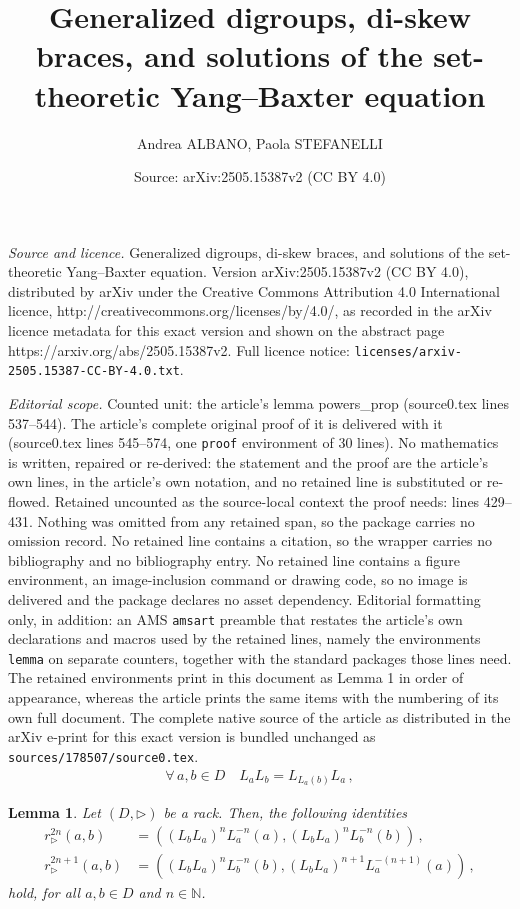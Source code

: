 \documentclass[10pt,a4paper]{amsart}
\title{Generalized digroups, di-skew braces, and solutions of the set-theoretic Yang--Baxter equation}
\author{Andrea ALBANO, Paola STEFANELLI}
\date{Source: arXiv:2505.15387v2 (CC BY 4.0)}
\newtheorem{lemma}{Lemma}
\newcommand{\tr}{\triangleright}
\begin{document}
\maketitle

\noindent\emph{Source and licence.} Generalized digroups, di-skew braces, and solutions of the set-theoretic Yang--Baxter equation. Version arXiv:2505.15387v2 (CC BY 4.0), distributed by arXiv under the Creative Commons Attribution 4.0 International licence, http://creativecommons.org/licenses/by/4.0/, as recorded in the arXiv licence metadata for this exact version and shown on the abstract page https://arxiv.org/abs/2505.15387v2. Full licence notice: \texttt{licenses/arxiv-2505.15387-CC-BY-4.0.txt}.\par\smallskip

\noindent\textit{Editorial scope.} Counted unit: the article's lemma powers\_prop (source0.tex lines 537--544). The article's complete original proof of it is delivered with it (source0.tex lines 545--574, one \texttt{proof} environment of 30 lines). No mathematics is written, repaired or re-derived: the statement and the proof are the article's own lines, in the article's own notation, and no retained line is substituted or re-flowed.  Retained uncounted as the source-local context the proof needs: lines 429--431.  Nothing was omitted from any retained span, so the package carries no omission record.  No retained line contains a citation, so the wrapper carries no bibliography and no bibliography entry.  No retained line contains a figure environment, an image-inclusion command or drawing code, so no image is delivered and the package declares no asset dependency.  Editorial formatting only, in addition: an AMS \texttt{amsart} preamble that restates the article's own declarations and macros used by the retained lines, namely the environments \texttt{lemma} on separate counters, together with the standard packages those lines need.  The retained environments print in this document as Lemma 1 in order of appearance, whereas the article prints the same items with the numbering of its own full document.  The complete native source of the article as distributed in the arXiv e-print for this exact version is bundled unchanged as \texttt{sources/178507/source0.tex}.
\begin{align}\label{self_distri1}
    \forall\, a,b \in D \quad L_aL_b = L_{L_a(b)}L_a \,,
\end{align}

\begin{lemma}\label{powers_prop}
    Let $(D,\triangleright)$ be a rack. Then, the following identities 
    \begin{align}
        r_\tr^{2n}(a,b) &= \left((L_bL_a)^nL_a^{-n}(a),(L_bL_a)^nL_b^{-n}(b)\right) \label{even_powers2}\,, \\[0.2cm]
        r_\tr^{2n+1}(a,b) &= \left((L_bL_a)^nL_b^{-n}(b),(L_bL_a)^{n+1}L_a^{-(n+1)}(a)\right) \label{odd_powers2}\,,
    \end{align}
    hold, for all $a,b \in D$ and $n\in\mathbb{N}$.
\end{lemma}
\end{document}
